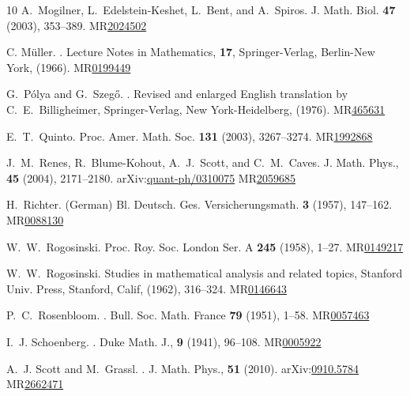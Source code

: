 \documentclass[11pt, leqno]{amsart}
\def\arXiv#1{arXiv:\href{http://arXiv.org/abs/#1}{#1}}
\def\MR#1{MR\href{http://www.ams.org/mathscinet-getitem?mr=#1}{#1}}
\theoremstyle{definition}
\numberwithin{equation}{section}
\begin{document}
\begin{thebibliography}{10}
A.~Mogilner, L.~Edelstein-Keshet, L.~Bent, and A.~Spiros.
\newblock J. Math. Biol. {\bf 47} (2003), 353--389.
\MR{2024502}


C. M{\"u}ller.
.
\newblock Lecture Notes in Mathematics, {\bf 17}, Springer-Verlag, Berlin-New York, (1966).
\MR{0199449}

G.~P\'{o}lya and G.~Szeg{\H{o}}.
.
\newblock Revised and enlarged English translation by C.~E.~Billigheimer, Springer-Verlag, New York-Heidelberg, (1976).
\MR{465631}

E.~T.~Quinto.
\newblock Proc. Amer. Math. Soc. {\bf 131} (2003), 3267--3274. 
\MR{1992868}


J.~M.~Renes, R.~Blume-Kohout, A.~J.~Scott, and C.~M.~Caves. 
\newblock  J. Math. Phys., {\bf 45} (2004), 2171--2180.
\arXiv{quant-ph/0310075}
\MR{2059685}

H.~Richter. 
\newblock (German)  Bl. Deutsch. Ges. Versicherungsmath.  {\bf 3 } (1957), 147--162.
\MR{0088130}

W.~W.~Rogosinski.
\newblock Proc. Roy. Soc. London Ser. A {\bf 245} (1958), 1--27.
\MR{0149217}

W.~W.~Rogosinski.
\newblock Studies in mathematical analysis and related topics, Stanford Univ. Press, Stanford, Calif, (1962), 316--324. 
\MR{0146643}

P.~C.~Rosenbloom.
.
\newblock Bull. Soc. Math. France {\bf 79} (1951), 1--58.
\MR{0057463}


I.~J. Schoenberg.
.
\newblock  Duke Math. J., {\bf 9} (1941), 96--108.
\MR{0005922}

A.~J. Scott and  M.~Grassl. 
.
\newblock J. Math. Phys., {\bf{51}} (2010).
\arXiv{0910.5784}
\MR{2662471}


\end{thebibliography}
\end{document}
